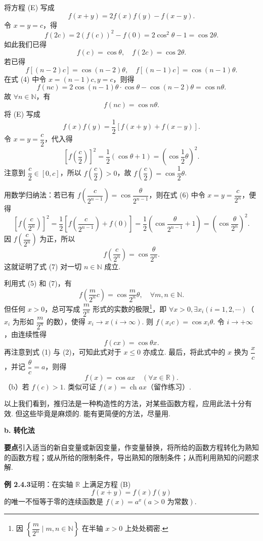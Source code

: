 \documentclass[UTF8,12pt,a4paper,fontset=fandol]{ctexart}
\begin{document}
将方程 (E) 写成
\[
  f(x+y)=2f(x)f(y)-f(x-y). \tag{4}
\]
令 $x=y=c$，得
\[
  f(2c)=2(f(c))^2-f(0)=2\cos^2\theta-1=\cos2\theta.
\]
如此我们已得
\[
  f(c)=\cos\theta,\quad f(2c)=\cos2\theta.
\]
若已得
\[
  f[(n-2)c]=\cos(n-2)\theta,\quad f[(n-1)c]=\cos(n-1)\theta.
\]
在式 (4) 中令 $x=(n-1)c,y=c$，则得
\[
  f(nc)=2\cos(n-1)\theta\cdot\cos\theta-\cos(n-2)\theta=\cos n\theta.
\]
故 $\forall n\in\mathbb{N}$，有
  \[
    f(nc)=\cos n\theta. \tag{5}
  \]
将 (E) 写成
\[
  f(x)f(y)=\frac12[f(x+y)+f(x-y)]. \tag{6}
\]
令 $x=y=\dfrac c2$，代入得
\[
  \left[f\left(\frac c2\right)\right]^2=\frac12(\cos\theta+1)=\left(\cos\frac12\theta\right)^2.
\]
注意到 $\dfrac c2\in[0,c]$，所以 $f\left(\dfrac c2\right)>0$，故 $f\left(\dfrac c2\right)=\cos\dfrac12\theta$.

用数学归纳法：若已有 $f\left(\dfrac c{2^{n-1}}\right)=\cos\dfrac{\theta}{2^{n-1}}$，则在式 (6) 中令 $x=y=\dfrac c{2^n}$，便得
\[
  \left[f\left(\frac c{2^n}\right)\right]^2
  =\frac12\left[f\left(\frac c{2^{n-1}}\right)+f(0)\right]
  =\frac12\left(\cos\frac{\theta}{2^{n-1}}+1\right)
  =\left(\cos\frac{\theta}{2^n}\right)^2.
\]
因 $f\left(\dfrac c{2^n}\right)$ 为正，所以
\[
  f\left(\frac c{2^n}\right)=\cos\frac{\theta}{2^n}. \tag{7}
\]
这就证明了式 (7) 对一切 $n\in\mathbb{N}$ 成立.

利用式 (5) 和 (7)，有
\[
  f\left(\frac m{2^n}c\right)=\cos\frac m{2^n}\theta,\quad \forall m,n\in\mathbb{N}. \tag{8}
\]
但任何 $x>0$，总可写成 $\dfrac m{2^n}$ 形式的实数的极限\footnote{因 $\left\{\dfrac m{2^n}\mid m,n\in\mathbb{N}\right\}$ 在半轴 $x>0$ 上处处稠密.}，即 $\forall x>0,\exists x_i(i=1,2,\cdots)$（$x_i$ 为形如 $\dfrac m{2^n}$ 的数），使得 $x_i\to x(i\to\infty)$. 则 $f(x_ic)=\cos x_i\theta$. 令 $i\to+\infty$，由连续性得
\[
  f(cx)=\cos\theta x.
\]
再注意到式 (1) 与 (2)，可知此式对于 $x\le0$ 亦成立. 最后，将此式中的 $x$ 换为 $\dfrac xc$，并记 $\dfrac\theta c=a$，则得
\[
  f(x)=\cos ax\quad(\forall x\in\mathbb{R}).
\]
（b）若 $f(c)>1$. 类似可证 $f(x)=\operatorname{ch} ax$（留作练习）.

以上我们看到，推归法是一种构造性的方法，对某些函数方程，应用此法十分有效. 但这些毕竟是麻烦的. 能有更简便的方法，尽量用.

\noindent\textbf{b. 转化法}

\noindent\textbf{要点}\quad 引入适当的新自变量或新因变量，作变量替换，将所给的函数方程转化为熟知的函数方程；或从所给的限制条件，导出熟知的限制条件；从而利用熟知的问题求解.

\noindent\textbf{例 2.4.3}\quad 证明：在实轴 $\mathbb{R}$ 上满足方程 (B)
\[
  f(x+y)=f(x)f(y)
\]
的唯一不恒等于零的连续函数是 $f(x)=a^x(a>0\text{ 为常数})$.
\end{document}
